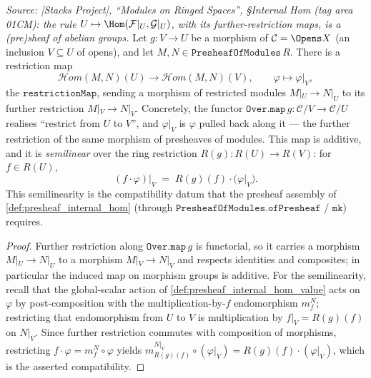 \begin{lemma}

  \label{lem:presheaf_internal_hom_restriction}
  \textit{Source: [Stacks Project], ``Modules on Ringed Spaces'', \S Internal Hom
  (tag area 01CM): the rule \(U \mapsto \Hom(\mathcal{F}|_U, \mathcal{G}|_U)\), with its
  further-restriction maps, is a (pre)sheaf of abelian groups.}
  Let \(g : V \to U\) be a morphism of \(\mathcal{C} = \Opens X\) (an inclusion
  \(V \subseteq U\) of opens), and let \(M, N \in \mathtt{PresheafOfModules}\,R\). There
  is a restriction map
  \[
    \mathcal{H}om(M, N)(U) \longrightarrow \mathcal{H}om(M, N)(V),
    \qquad \varphi \longmapsto \varphi|_V,
  \]
  the \(\mathtt{restrictionMap}\), sending a morphism of restricted modules
  \(M|_U \to N|_U\) to its further restriction \(M|_V \to N|_V\). Concretely, the
  functor \(\mathtt{Over.map}\,g : \mathcal{C}/V \to \mathcal{C}/U\) realises
  ``restrict from \(U\) to \(V\)'', and \(\varphi|_V\) is \(\varphi\) pulled back along
  it --- the further restriction of the same morphism of presheaves of modules. This
  map is additive, and it is \emph{semilinear} over the ring restriction
  \(R(g) : R(U) \to R(V)\): for \(f \in R(U)\),
  \[
    (f \cdot \varphi)\big|_V \;=\; R(g)(f) \cdot \bigl(\varphi|_V\bigr).
  \]
  This semilinearity is the compatibility datum that the presheaf assembly of
  \cref{def:presheaf_internal_hom} (through \(\mathtt{PresheafOfModules.ofPresheaf}\) /
  \(\mathtt{mk}\)) requires.
\end{lemma}

\begin{proof}
  \leanok
  Further restriction along \(\mathtt{Over.map}\,g\) is functorial, so it carries a
  morphism \(M|_U \to N|_U\) to a morphism \(M|_V \to N|_V\) and respects identities and
  composites; in particular the induced map on morphism groups is additive. For the
  semilinearity, recall that the global-scalar action of
  \cref{def:presheaf_internal_hom_value} acts on \(\varphi\) by post-composition with
  the multiplication-by-\(f\) endomorphism \(m_f^{N}\); restricting that endomorphism
  from \(U\) to \(V\) is multiplication by \(f|_V = R(g)(f)\) on \(N|_V\). Since further
  restriction commutes with composition of morphisms, restricting \(f \cdot \varphi =
  m_f^{N} \circ \varphi\) yields \(m_{R(g)(f)}^{N|_V} \circ (\varphi|_V) = R(g)(f) \cdot
  (\varphi|_V)\), which is the asserted compatibility.
\end{proof}

